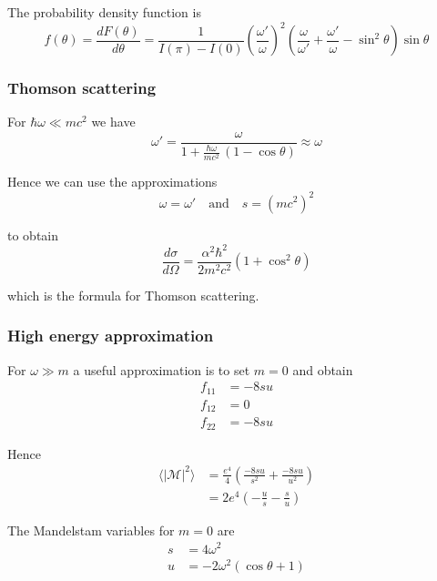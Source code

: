 The probability density function is
\begin{equation*}
f(\theta)=\frac{dF(\theta)}{d\theta}
=\frac{1}{I(\pi)-I(0)}
\left(\frac{\omega'}{\omega}\right)^2
\left(\frac{\omega}{\omega'}+\frac{\omega'}{\omega}-\sin^2\theta\right)
\sin\theta
\end{equation*}

\subsubsection*{Thomson scattering}

For $\hbar\omega\ll mc^2$ we have
\begin{equation*}
\omega'=\frac{\omega}{1+\frac{\hbar\omega}{mc^2}\,(1-\cos\theta)}\approx\omega
\end{equation*}

Hence we can use the approximations
\begin{equation*}
\omega=\omega'\quad\text{and}\quad s=(mc^2)^2
\end{equation*}

to obtain
\begin{equation*}
\frac{d\sigma}{d\Omega}=\frac{\alpha^2\hbar^2}{2m^2c^2}\left(1+\cos^2\theta\right)
\end{equation*}

which is the formula for Thomson scattering.

\subsubsection*{High energy approximation}

For $\omega\gg m$ a useful approximation is to set $m=0$ and obtain
\begin{align*}
f_{11}&=-8su
\\
f_{12}&=0
\\
f_{22}&=-8su
\end{align*}

Hence
\begin{align*}
\langle|\mathcal{M}|^2\rangle
&=\frac{e^4}{4}
\left(\frac{-8su}{s^2}+\frac{-8su}{u^2}\right)
\\
&=2e^4
\left(-\frac{u}{s}-\frac{s}{u}\right)
\end{align*}

The Mandelstam variables for $m=0$ are
\begin{align*}
s&=4\omega^2
\\
u&=-2\omega^2(\cos\theta+1)
\end{align*}

